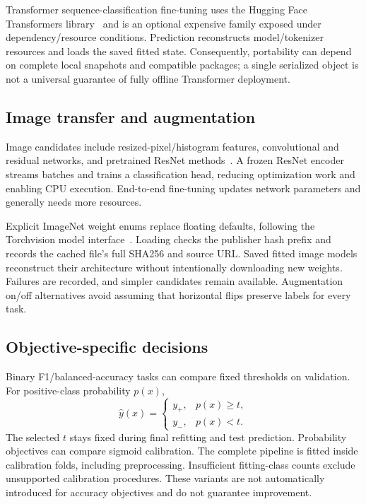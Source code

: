 \documentclass[11pt,a4paper]{article}
\begin{document}
Transformer sequence-classification fine-tuning uses the Hugging Face Transformers library~\cite{transformers} and is an optional expensive family exposed under dependency/resource conditions. Prediction reconstructs model/tokenizer resources and loads the saved fitted state. Consequently, portability can depend on complete local snapshots and compatible packages; a single serialized object is not a universal guarantee of fully offline Transformer deployment.

\subsection{Image transfer and augmentation}
Image candidates include resized-pixel/histogram features, convolutional and residual networks, and pretrained ResNet methods~\cite{resnet}. A frozen ResNet encoder streams batches and trains a classification head, reducing optimization work and enabling CPU execution. End-to-end fine-tuning updates network parameters and generally needs more resources.

Explicit ImageNet weight enums replace floating defaults, following the Torchvision model interface~\cite{torchvision}. Loading checks the publisher hash prefix and records the cached file's full SHA256 and source URL. Saved fitted image models reconstruct their architecture without intentionally downloading new weights. Failures are recorded, and simpler candidates remain available. Augmentation on/off alternatives avoid assuming that horizontal flips preserve labels for every task.

\subsection{Objective-specific decisions}
Binary F1/balanced-accuracy tasks can compare fixed thresholds on validation. For positive-class probability $p(x)$,
\begin{equation}\widehat y(x)=\begin{cases}y_+,&p(x)\geq t,\\ y_-,&p(x)<t.\end{cases}\end{equation}
The selected $t$ stays fixed during final refitting and test prediction. Probability objectives can compare sigmoid calibration. The complete pipeline is fitted inside calibration folds, including preprocessing. Insufficient fitting-class counts exclude unsupported calibration procedures. These variants are not automatically introduced for accuracy objectives and do not guarantee improvement.
\end{document}
